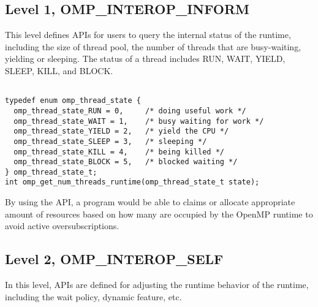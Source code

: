 \subsection{Level 1, OMP\_INTEROP\_INFORM}
This level defines APIs for users to query the internal status of the runtime, including the size of thread pool, the number of threads
that are busy-waiting, yielding or sleeping. The status of a thread includes RUN, WAIT, YIELD, SLEEP, KILL, and BLOCK. 

\lstset{basicstyle=\sffamily\small,language=c, numbersep=1pt}
\begin{lstlisting}[frame=single]  % Start your code-block

typedef enum omp_thread_state {
  omp_thread_state_RUN = 0,     /* doing useful work */
  omp_thread_state_WAIT = 1,    /* busy waiting for work */
  omp_thread_state_YIELD = 2,   /* yield the CPU */
  omp_thread_state_SLEEP = 3,   /* sleeping */
  omp_thread_state_KILL = 4,    /* being killed */
  omp_thread_state_BLOCK = 5,   /* blocked waiting */
} omp_thread_state_t; 
int omp_get_num_threads_runtime(omp_thread_state_t state);
\end{lstlisting}

By using the API, a program would be able to claims or allocate appropriate amount of resources based on how many are occupied by the OpenMP
runtime to avoid active oversubscriptions. 

\subsection{Level 2, OMP\_INTEROP\_SELF} 
In this level, APIs are defined for adjusting the runtime behavior of the runtime, including the wait policy, dynamic feature, etc.

